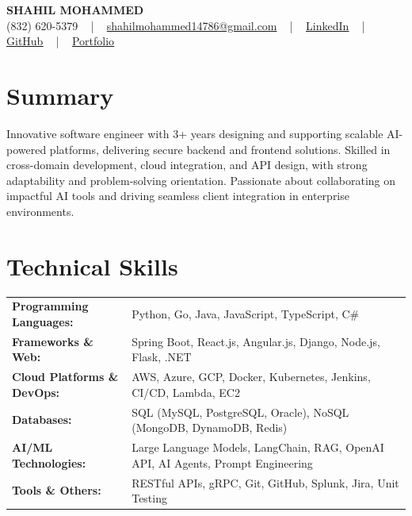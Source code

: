 \documentclass[letterpaper,11pt]{article}
\begin{document}
\begin{center}
    {\fontsize{14pt}{12pt}\selectfont \textbf{\MakeUppercase{Shahil Mohammed}}}\\ \vspace{2pt}
    \fontsize{10pt}{12pt}\selectfont (832) 620-5379 ~ | ~ \href{mailto:shahilmohammed14786@gmail.com}{shahilmohammed14786@gmail.com} ~ | ~  
    \href{https://www.linkedin.com/in/shahil-mohammed-9652931a1/}{\color{blue}\underline{LinkedIn}}  ~ | ~ 
    \href{https://github.com/freakbeast14}{\color{blue}\underline{GitHub}} ~ | ~ 
    \href{https://shahil-mohammed.netlify.app/}{\color{blue}\underline{Portfolio}}
    \vspace{-8pt}
\end{center}

\section{Summary}
\fontsize{9pt}{10pt}\selectfont
Innovative software engineer with 3+ years designing and supporting scalable AI-powered platforms, delivering secure backend and frontend solutions. Skilled in cross-domain development, cloud integration, and API design, with strong adaptability and problem-solving orientation. Passionate about collaborating on impactful AI tools and driving seamless client integration in enterprise environments.
 \vspace{-5pt}
 
\section{Technical Skills}
        \vspace{-14pt}
        \begin{table}[h]
            \fontsize{9pt}{10pt}\selectfont
            \begin{tabular}{p{0.3\linewidth} p{0.7\linewidth}}
                \textbf{Programming Languages:} & Python, Go, Java, JavaScript, TypeScript, C\# \\
                \textbf{Frameworks \& Web:} & Spring Boot, React.js, Angular.js, Django, Node.js, Flask, .NET \\
                \textbf{Cloud Platforms \& DevOps:} & AWS, Azure, GCP, Docker, Kubernetes, Jenkins, CI/CD, Lambda, EC2 \\
                \textbf{Databases:} & SQL (MySQL, PostgreSQL, Oracle), NoSQL (MongoDB, DynamoDB, Redis) \\
                \textbf{AI/ML Technologies:} & Large Language Models, LangChain, RAG, OpenAI API, AI Agents, Prompt Engineering \\
                \textbf{Tools \& Others:} & RESTful APIs, gRPC, Git, GitHub, Splunk, Jira, Unit Testing \\
            \end{tabular}
        \end{table}
 \vspace{-15pt}
 
\end{document}

